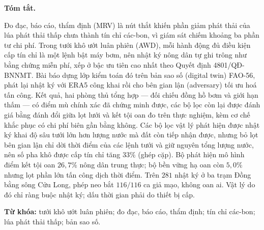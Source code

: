   \vspace{8pt}

  \vspace{4pt}

  \vspace{4pt}

  \vspace{6pt}
  \begin{hujosabstract}
  \noindent\textbf{Tóm tắt.}

 Đo đạc, báo cáo, thẩm định (MRV) là nút thắt khiến phần giảm phát thải của lúa phát thải
 thấp chưa thành tín chỉ các-bon, vì giám sát chiếm khoảng ba phần tư chi
 phí. Trong tưới khô ướt luân phiên (AWD), mỗi hành động đủ điều kiện cấp
 tín chỉ là một lệnh bật máy bơm, nên nhật ký nông dân tự ghi trông như bằng chứng miễn phí,
 xếp ở bậc ưu tiên cao nhất theo Quyết định 4801/QĐ-BNNMT. Bài báo dựng lớp
 kiểm toán đó trên bản sao số (digital twin) FAO-56, phát lại nhật ký với ERA5 công khai rồi cho bên gian lận (adversary) tối ưu hoá tấn công. Kết quả, hai phòng thủ tổng hợp --- đối chiếu đồng hồ bơm và giới hạn thấm --- có điểm mù
chính xác đã chứng minh được, các bộ lọc còn lại được đánh giá bằng đánh đổi giữa lọt lưới
và kết tội oan đo trên thực nghiệm, kèm cơ chế khắc phục có chi phí biên gần bằng không. Các bộ lọc vật lý phát hiện được nhật ký khai độ sâu tưới lớn hơn lượng nước mà đất
còn tiếp nhận được, nhưng bỏ lọt bên gian lận chỉ dời thời điểm của các lệnh tưới và giữ
nguyên tổng lượng nước, nên số pha khô được cấp tín chỉ tăng $33\%$ (ghép cặp). Bộ phát hiện mô hình điểm
 kết tội oan $26{,}7\%$ nông dân trung thực; bộ bền vững hạ oan còn $5{,}0\%$ nhưng lọt phần
 lớn tấn công dịch thời điểm. Trên $281$ nhật ký ở ba trạm Đồng bằng sông Cửu Long, phép neo
 bắt $116/116$ ca giả mạo, không oan ai. Vật lý do đó chỉ ràng buộc nhật ký; dấu thời gian
 phải do thiết bị cấp.

\noindent\textbf{Từ khóa:} tưới khô ướt luân phiên; đo đạc, báo cáo, thẩm định; tín chỉ
  các-bon; lúa phát thải thấp; bản sao số.

  \vspace{10pt}
  \end{hujosabstract}
\endgroup

